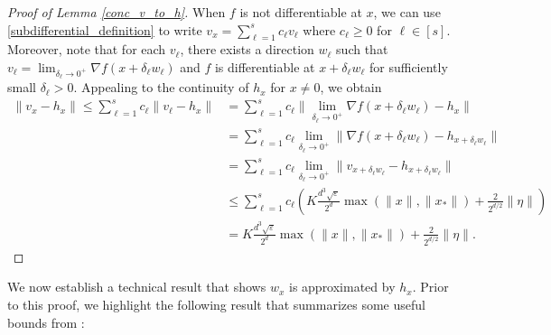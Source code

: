 \documentclass[11pt]{article}
\renewcommand{\epsilon}{\varepsilon}
\theoremstyle{remark}
\begin{document}
\begin{proof}[Proof of Lemma \ref{conc_v_to_h}]
When $f$ is not differentiable at $x$, we can use \eqref{subdifferential_definition} to write $v_x = \sum_{\ell=1}^s c_{\ell}v_{\ell}$ where $c_{\ell} \geqslant 0$ for $\ell \in [s]$. Moreover, note that for each $v_{\ell}$, there exists a direction $w_{\ell}$ such that $v_{\ell} = \lim_{\delta_{\ell} \rightarrow 0^+} \nabla f(x+\delta_{\ell}w_{\ell})$ and $f$ is differentiable at $x+\delta_{\ell}w_{\ell}$ for sufficiently small $\delta_{\ell} > 0$. Appealing to the continuity of $h_x$ for $x \neq 0$, we obtain \begin{align*}
    \|v_x - h_x\| \leqslant \sum_{\ell=1}^s c_{\ell}\|v_{\ell} - h_x \|  & = \sum_{\ell=1}^s c_{\ell} \Big\|\lim_{\delta_{\ell} \rightarrow 0^+} \nabla f(x+\delta_{\ell}w_{\ell}) - h_x\Big\| \\
    & = \sum_{\ell=1}^s c_{\ell} \lim_{\delta_{\ell} \rightarrow 0^+}\| \nabla f(x+\delta_{\ell}w_{\ell}) - h_{x+\delta_{\ell}w_{\ell}}\| \\
    & = \sum_{\ell=1}^s c_{\ell} \lim_{\delta_{\ell} \rightarrow 0^+}\| v_{x+\delta_{\ell}w_{\ell}} - h_{x+\delta_{\ell}w_{\ell}}\| \\
    & \leqslant \sum_{\ell=1}^s c_{\ell} \left(K \frac{d^3\sqrt{\epsilon}}{2^d}\max(\|x\|,\|x_*\|) + \frac{2}{2^{d/2}}\|\eta\|\right)\\
    & = K \frac{d^3\sqrt{\epsilon}}{2^d}\max(\|x\|,\|x_*\|) + \frac{2}{2^{d/2}}\|\eta\|.
\end{align*} 
\end{proof}

We now establish a technical result that shows $w_x$ is approximated by $h_x$. Prior to this proof, we highlight the following result that summarizes some useful bounds from \cite{HV2017}:
\end{document}
